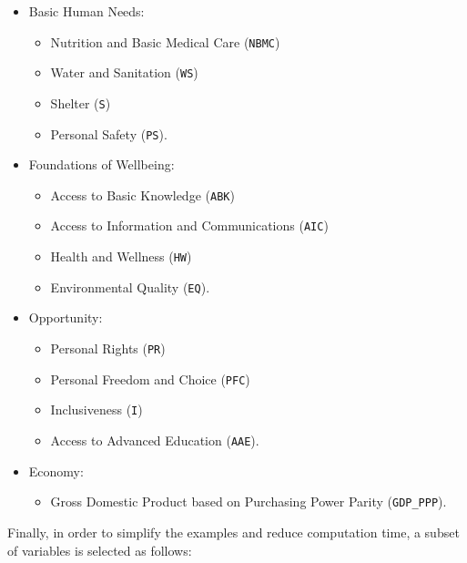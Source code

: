 \begin{itemize}
\tightlist
\item
  Basic Human Needs:

  \begin{itemize}
  \tightlist
  \item
    Nutrition and Basic Medical Care (\texttt{NBMC})
  \item
    Water and Sanitation (\texttt{WS})
  \item
    Shelter (\texttt{S})
  \item
    Personal Safety (\texttt{PS}).
  \end{itemize}
\item
  Foundations of Wellbeing:

  \begin{itemize}
  \tightlist
  \item
    Access to Basic Knowledge (\texttt{ABK})
  \item
    Access to Information and Communications (\texttt{AIC})
  \item
    Health and Wellness (\texttt{HW})
  \item
    Environmental Quality (\texttt{EQ}).
  \end{itemize}
\item
  Opportunity:

  \begin{itemize}
  \tightlist
  \item
    Personal Rights (\texttt{PR})
  \item
    Personal Freedom and Choice (\texttt{PFC})
  \item
    Inclusiveness (\texttt{I})
  \item
    Access to Advanced Education (\texttt{AAE}).
  \end{itemize}
\item
  Economy:

  \begin{itemize}
  \tightlist
  \item
    Gross Domestic Product based on Purchasing Power Parity
    (\texttt{GDP\_PPP}).
  \end{itemize}
\end{itemize}

Finally, in order to simplify the examples and reduce computation time,
a subset of variables is selected as follows:

